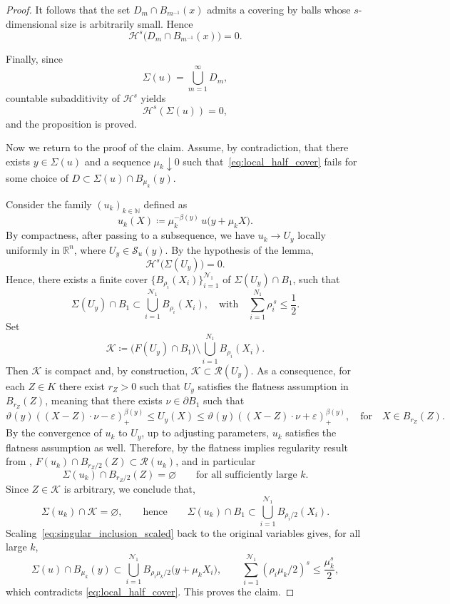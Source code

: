 \documentclass[reqno,11pt]{amsart}
\newcommand{\1}{\mathds{1}}  %
\numberwithin{equation}{section}
\begin{document}
\begin{proof}
It follows that the set $D_m \cap B_{m^{-1}}(x)$ admits a covering by balls whose $s$-dimensional size is arbitrarily small. Hence
\[
	\mathcal{H}^s\bigl(D_m \cap B_{m^{-1}}(x)\bigr) = 0.
\]

Finally, since
\[
	\Sigma(u) = \bigcup_{m=1}^\infty D_m,
\]
countable subadditivity of $\mathcal{H}^s$ yields
\[
	\mathcal{H}^s(\Sigma(u)) = 0,
\]
and the proposition is proved.

Now we return to the proof of the claim. Assume, by contradiction, that there exists $y\in\Sigma(u)$ and a sequence $\mu_k\downarrow 0$ such that~\eqref{eq:local_half_cover} fails for some choice of
$D \subset \Sigma(u)\cap B_{\mu_k}(y)$.

Consider the family $(u_k)_{k \in \mathbb{N}}$ defined as
\[
    u_k(X)\coloneqq \mu_k^{-\beta(y)}\,u\bigl(y+\mu_k X\bigr).
\]
By compactness, after passing to a subsequence, we have $u_k\to U_y$ locally uniformly in $\mathbb R^n$, where $U_y\in \mathcal{S}_u(y)$. By the hypothesis of the lemma,
\[
    \mathcal H^s\bigl(\Sigma(U_y)\bigr)=0.
\]
Hence, there exists a finite cover $\{B_{\rho_i}(X_i)\}_{i=1}^{\mathcal N_1}$ of $\Sigma(U_y)\cap B_1$, such that
\begin{equation}\label{eq:cover_blowup}
\Sigma(U_y)\cap B_1 \subset \bigcup_{i=1}^{\mathcal N_1} B_{\rho_i}(X_i),
\quad \text{with} \quad
\sum_{i=1}^{N_1} \rho_i^{\,s}\le \frac12.
\end{equation}
Set
\[
    \mathcal K \coloneqq \bigl(F(U_y)\cap B_1\bigr)\setminus \bigcup_{i=1}^{N_1} B_{\rho_i}(X_i).
\]
Then $\mathcal K$ is compact and, by construction, $\mathcal{K} \subset \mathcal{R}(U_y)$. As a consequence, for each $Z \in K$ there exist $r_Z>0$ such that $U_y$ satisfies the flatness assumption in $B_{r_Z}(Z)$, meaning that there exists $\nu \in \partial B_1$ such that
\[
    \vartheta(y)((X-Z)\cdot \nu - \varepsilon)_+^{\beta(y)} \le U_y(X) \le \vartheta(y)((X-Z)\cdot \nu + \varepsilon)_+^{\beta(y)}, \quad \text{for} \quad X \in B_{r_Z}(Z).
\]
By the convergence of $u_k$ to $U_y$, up to adjusting parameters, $u_k$ satisfies the flatness assumption as well. Therefore, by the flatness implies regularity result from \cite{ASTU1}, $F(u_k)\cap B_{r_Z/2}(Z) \subset \mathcal{R}(u_k)$, and in particular
\[
    \Sigma(u_k)\cap B_{r_Z/2}(Z)=\varnothing\qquad\text{for all sufficiently large }k.
\]
Since $Z \in \mathcal{K}$ is arbitrary, we conclude that,
\begin{equation}\label{eq:singular_inclusion_scaled}
\Sigma(u_k)\cap \mathcal{K} = \varnothing,
\qquad\text{hence}\qquad
\Sigma(u_k)\cap B_1 \subset \bigcup_{i=1}^{\mathcal N_1} B_{\rho_i/2}(X_i).
\end{equation}
Scaling~\eqref{eq:singular_inclusion_scaled} back to the original variables gives, for all large $k$,
\[
    \Sigma(u)\cap B_{\mu_k}(y)\subset \bigcup_{i=1}^{\mathcal N_1} B_{\rho_i\mu_k/2}\bigl(y+\mu_k X_i\bigr), \qquad
\sum_{i=1}^{\mathcal N_1}(\rho_i\mu_k/2)^s \le \frac{\mu_k^s}{2},
\]
which contradicts \eqref{eq:local_half_cover}. This proves the claim.
\end{proof}
\end{document}
